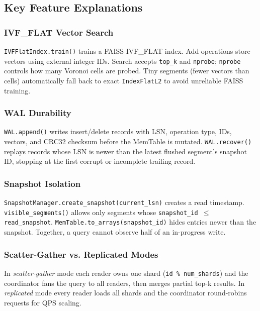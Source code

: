 \documentclass[11pt,a4paper]{article}
\begin{document}
\subsection{Key Feature Explanations}

\subsubsection{IVF\_FLAT Vector Search}

\texttt{IVFFlatIndex.train()} trains a FAISS IVF\_FLAT index. Add operations
store vectors using external integer IDs. Search accepts \texttt{top\_k} and
\texttt{nprobe}; \texttt{nprobe} controls how many Voronoi cells are probed.
Tiny segments (fewer vectors than cells) automatically fall back to exact
\texttt{IndexFlatL2} to avoid unreliable FAISS training.

\subsubsection{WAL Durability}

\texttt{WAL.append()} writes insert/delete records with LSN, operation type,
IDs, vectors, and CRC32 checksum before the MemTable is mutated.
\texttt{WAL.recover()} replays records whose LSN is newer than the latest
flushed segment's snapshot ID, stopping at the first corrupt or incomplete
trailing record.

\subsubsection{Snapshot Isolation}

\texttt{Snap\-shot\-Ma\-na\-ger.cre\-ate\_snap\-shot(current\_lsn)} creates a read
timestamp. \texttt{vis\-i\-ble\_seg\-ments()} allows only segments whose
\texttt{snap\-shot\_id $\leq$ read\_snap\-shot}.
\texttt{Mem\-Ta\-ble.to\_ar\-rays(snap\-shot\_id)} hides entries newer than the
snapshot. Together, a query cannot observe half of an in-progress write.

\subsubsection{Scatter-Gather vs. Replicated Modes}

In \emph{scatter-gather} mode each reader owns one shard (\texttt{id \%
num\_shards}) and the coordinator fans the query to all readers, then merges
partial top-k results. In \emph{replicated} mode every reader loads all shards
and the coordinator round-robins requests for QPS scaling.
\end{document}
